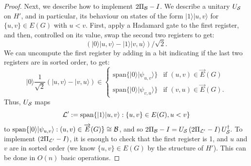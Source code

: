 \documentclass{theoretics}
\def\ket#1{{\lvert}#1\rangle}
\renewcommand{\>}{\rangle}
\newcommand{\<}{\langle}
\renewcommand{\(}{\left(}
\renewcommand{\)}{\right)}
\begin{document}
\begin{proof}
Next, we describe how to implement $2\Pi_{\cal B}-I$. We describe a unitary $U_{\cal S}$ on $H'$, and in particular, its behaviour on states of the form $\ket{1}\ket{u,v}$ for $\{u,v\}\in E(G)$ with $u<v$. First, apply a Hadamard gate to the first register, and then, controlled on its value, swap the second two registers to get:
$$\left(\ket{0}\ket{u,v} - \ket{1}\ket{v,u}\right)/\sqrt{2}.$$
We can uncompute the first register by adding in a bit indicating if the last two registers are in sorted order, to get:
$$\ket{0}\frac{1}{\sqrt{2}}\left(\ket{u,v} - \ket{v,u}\right)\in\left\{\begin{array}{ll}
\mathrm{span}\{\ket{0}\ket{\psi_{u,v}}\} & \mbox{if }(u,v)\in\overrightarrow{E}(G)\\
\mathrm{span}\{\ket{0}\ket{\psi_{v,u}}\} & \mbox{if }(v,u)\in\overrightarrow{E}(G).
\end{array}\right.$$
Thus, $U_{\cal S}$ maps
$${\cal L}':=\mathrm{span}\{\ket{1}\ket{u,v}:\{u,v\}\in E(G), u<v\}$$
to $\mathrm{span}\{\ket{0}\ket{\psi_{u,v}}:(u,v)\in\overrightarrow{E}(G)\}\cong {\cal B}$, and so 
$2\Pi_{\cal B}-I = U_{\cal S} \left(2\Pi_{{\cal L}'}  -I\right) U_{\cal S}^\dagger.$
To implement $\left(2\Pi_{{\cal L}'}  -I\right)$, it is enough to check that the first register is 1, and $u$ and $v$ are in sorted order (we know $\{u,v\}\in E(G)$ by the structure of $H'$). This can be done in $O(n)$ basic operations.
\end{proof}
\end{document}
